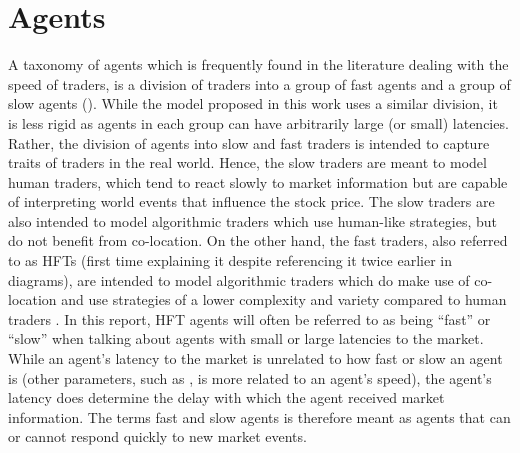\section{Agents}\label{section:agents}

A taxonomy of agents which is frequently found in the literature dealing with the speed of traders, is a division of traders into a group of fast agents and a group of slow agents (\cite{foucault2012news, hoffmann2012dynamic, mcinish2012strategic}). While the model proposed in this work uses a similar division, it is less rigid as agents in each group can have arbitrarily large (or small) latencies. Rather, the division of agents into slow and fast traders is intended to capture traits of traders in the real world. Hence, the slow traders are meant to model human traders, which tend to react slowly to market information but are capable of interpreting world events that influence the stock price. The slow traders are also intended to model algorithmic traders which use human-like strategies, but do not benefit from co-location. On the other hand, the fast traders, also referred to as HFTs (first time explaining it despite referencing it twice earlier in diagrams), are intended to model algorithmic traders which do make use of co-location \cite{brogaard2013trading} and use strategies of a lower complexity and variety compared to human traders \cite{chaboud2009rise}.  In this report, HFT agents will often be referred to as being ``fast'' or ``slow'' when talking about agents with small or large latencies to the market. While an agent's latency to the market is unrelated to how fast or slow an agent is (other parameters, such as ,  is more related to an agent's speed), the agent's latency does determine the delay with which the agent received market information. The terms fast and slow agents is therefore meant as agents that can or cannot respond quickly to new market events.

